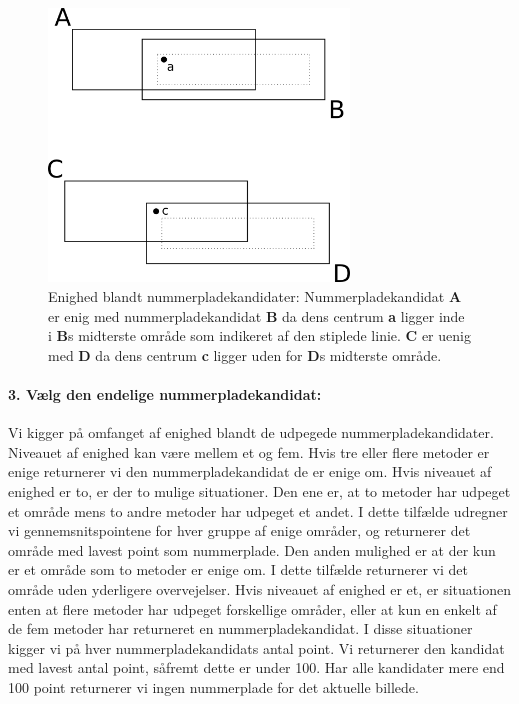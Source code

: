 \begin{figure}[htp]
\centering
\includegraphics[width=8cm]{implementation/illu/illu_enighed.png}
\caption{Enighed blandt nummerpladekandidater: Nummerpladekandidat \textbf{A} er enig med nummerpladekandidat \textbf{B} da dens centrum \textbf{a} ligger inde i \textbf{B}s midterste område som indikeret af den stiplede linie. \textbf{C} er uenig med \textbf{D} da dens centrum \textbf{c} ligger uden for \textbf{D}s midterste område.}
\label{fig:enighed}
\end{figure}

\paragraph{3. Vælg den endelige nummerpladekandidat:}
Vi kigger på omfanget af enighed blandt de udpegede nummerpladekandidater. Niveauet af enighed kan være mellem et og fem. Hvis tre eller flere metoder er enige returnerer vi den nummerpladekandidat de er enige om. Hvis niveauet af enighed er to, er der to mulige situationer. Den ene er, at to metoder har udpeget et område mens to andre metoder har udpeget et andet. I dette tilfælde udregner vi gennemsnitspointene for hver gruppe af enige områder, og returnerer det område med lavest point som nummerplade. Den anden mulighed er at der kun er et område som to metoder er enige om. I dette tilfælde returnerer vi det område uden yderligere overvejelser. Hvis niveauet af enighed er et, er situationen enten at flere metoder har udpeget forskellige områder, eller at kun en enkelt af de fem metoder har returneret en nummerpladekandidat. I disse situationer kigger vi på hver nummerpladekandidats antal point. Vi returnerer den kandidat med lavest antal point, såfremt dette er under 100. Har alle kandidater mere end 100 point returnerer vi ingen nummerplade for det aktuelle billede.

